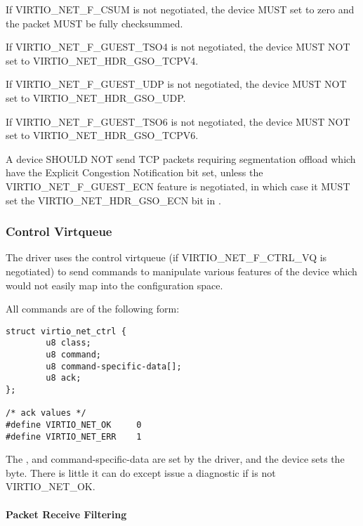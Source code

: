 
If VIRTIO_NET_F_CSUM is not negotiated, the device MUST set
 to zero and the packet MUST be fully checksummed.

If VIRTIO_NET_F_GUEST_TSO4 is not negotiated, the device MUST NOT set
 to VIRTIO_NET_HDR_GSO_TCPV4.

If VIRTIO_NET_F_GUEST_UDP is not negotiated, the device MUST NOT set
 to VIRTIO_NET_HDR_GSO_UDP.

If VIRTIO_NET_F_GUEST_TSO6 is not negotiated, the device MUST NOT set
 to VIRTIO_NET_HDR_GSO_TCPV6.

A device SHOULD NOT send TCP packets requiring segmentation offload
which have the Explicit Congestion Notification bit set, unless the
VIRTIO_NET_F_GUEST_ECN feature is negotiated, in which case it MUST set
the VIRTIO_NET_HDR_GSO_ECN bit in .

\subsubsection{Control Virtqueue}\label{sec:Device Types / Network Device / Device Operation / Control Virtqueue}

The driver uses the control virtqueue (if VIRTIO_NET_F_CTRL_VQ is
negotiated) to send commands to manipulate various features of
the device which would not easily map into the configuration
space.

All commands are of the following form:

\begin{lstlisting}
struct virtio_net_ctrl {
        u8 class;
        u8 command;
        u8 command-specific-data[];
        u8 ack;
};

/* ack values */
#define VIRTIO_NET_OK     0
#define VIRTIO_NET_ERR    1
\end{lstlisting}

The ,  and command-specific-data are set by the
driver, and the device sets the  byte. There is little it can
do except issue a diagnostic if  is not
VIRTIO_NET_OK.

\paragraph{Packet Receive Filtering}\label{sec:Device Types / Network Device / Device Operation / Control Virtqueue / Packet Receive Filtering}

